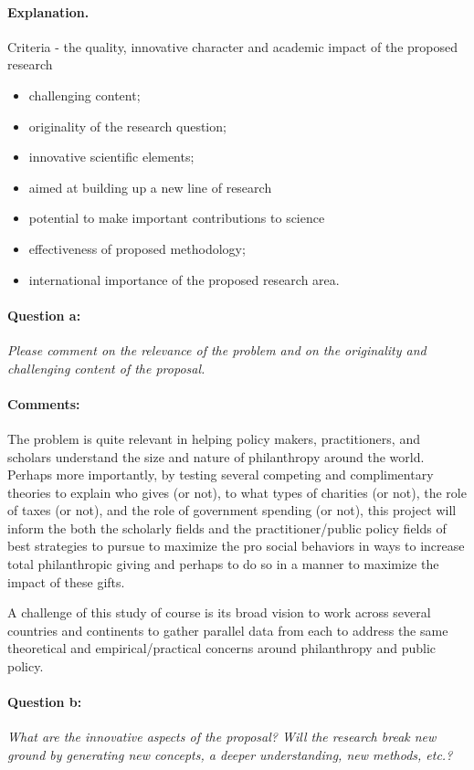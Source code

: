 \documentclass[twocolumn, serif, rga, numeric]{jote-article}
\begin{document}
\paragraph{Explanation.}
Criteria - the quality, innovative character and academic impact of the proposed research 
\begin{itemize} 
\item challenging content; \item originality of the research question; \item innovative scientific elements; \item aimed at building up a new line of research\item potential to make important contributions to science\item effectiveness of proposed methodology; \item international importance of the proposed research area.
\end{itemize}
\paragraph{Question a:}
\textit{Please comment on the relevance of the problem and on the originality and challenging content of the proposal.}
\paragraph{Comments:}
The problem is quite relevant in helping policy makers, practitioners, and scholars understand the size and nature of philanthropy around the world. Perhaps more importantly, by testing several competing and complimentary theories to explain who gives (or not), to what types of charities (or not), the role of taxes (or not), and the role of government spending (or not), this project will inform the both the scholarly fields and the practitioner/public policy fields of best strategies to pursue to maximize the pro social behaviors in ways to increase total philanthropic giving and perhaps to do so in a manner to maximize the impact of these gifts.

A challenge of this study of course is its broad vision to work across several countries and continents to gather parallel data from each to address the same theoretical and empirical/practical concerns around philanthropy and public policy.
\paragraph{Question b:}
\textit{What are the innovative aspects of the proposal? Will the research break new ground by generating new concepts, a deeper understanding, new methods, etc.?}
\end{document}
